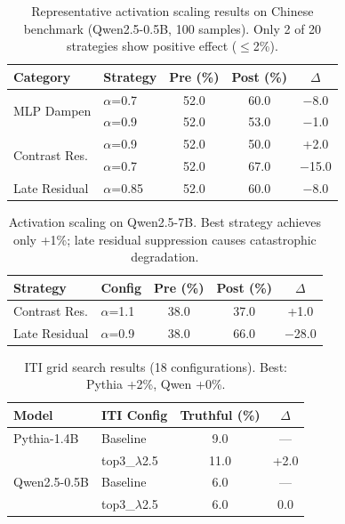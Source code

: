 \documentclass{article}
\begin{document}
\begin{table}[h]
\centering
\small
\begin{tabular}{llccc}
\toprule
\textbf{Category} & \textbf{Strategy} & \textbf{Pre (\%)} & \textbf{Post (\%)} & \textbf{$\Delta$} \\
\midrule
\multirow{2}{*}{MLP Dampen} & $\alpha$=0.7 & 52.0 & 60.0 & $-$8.0 \\
 & $\alpha$=0.9 & 52.0 & 53.0 & $-$1.0 \\
\midrule
\multirow{2}{*}{Contrast Res.} & $\alpha$=0.9 & 52.0 & 50.0 & +2.0 \\
 & $\alpha$=0.7 & 52.0 & 67.0 & $-$15.0 \\
\midrule
Late Residual & $\alpha$=0.85 & 52.0 & 60.0 & $-$8.0 \\
\bottomrule
\end{tabular}
\caption{Representative activation scaling results on Chinese benchmark (Qwen2.5-0.5B, 100 samples). Only 2 of 20 strategies show positive effect ($\leq$2\%).}
\label{tab:neg_scaling_05b}
\end{table}

\begin{table}[h]
\centering
\small
\begin{tabular}{llccc}
\toprule
\textbf{Strategy} & \textbf{Config} & \textbf{Pre (\%)} & \textbf{Post (\%)} & \textbf{$\Delta$} \\
\midrule
Contrast Res. & $\alpha$=1.1 & 38.0 & 37.0 & +1.0 \\
Late Residual & $\alpha$=0.9 & 38.0 & 66.0 & $-$28.0 \\
\bottomrule
\end{tabular}
\caption{Activation scaling on Qwen2.5-7B. Best strategy achieves only +1\%; late residual suppression causes catastrophic degradation.}
\label{tab:neg_scaling_7b}
\end{table}

\begin{table}[h]
\centering
\small
\begin{tabular}{llcc}
\toprule
\textbf{Model} & \textbf{ITI Config} & \textbf{Truthful (\%)} & \textbf{$\Delta$} \\
\midrule
Pythia-1.4B & Baseline & 9.0 & --- \\
 & top3\_$\lambda$2.5 & 11.0 & +2.0 \\
Qwen2.5-0.5B & Baseline & 6.0 & --- \\
 & top3\_$\lambda$2.5 & 6.0 & 0.0 \\
\bottomrule
\end{tabular}
\caption{ITI grid search results (18 configurations). Best: Pythia +2\%, Qwen +0\%.}
\label{tab:neg_iti}
\end{table}
\end{document}
